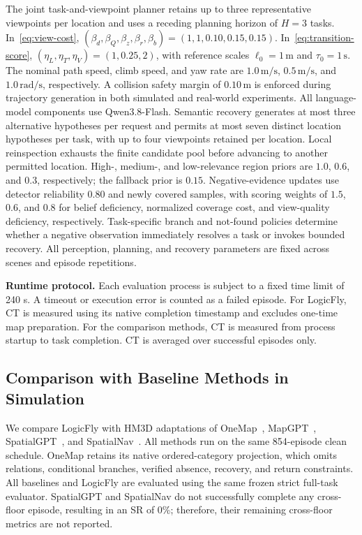 \documentclass[letterpaper,10pt,journal]{IEEEtran}
\begin{document}
The joint task-and-viewpoint planner retains up to three representative viewpoints per location and uses a receding planning horizon of $H=3$ tasks. In~\eqref{eq:view-cost}, $(\beta_d,\beta_Q,\beta_z,\beta_r,\beta_b)=(1,1,0.10,0.15,0.15)$. In~\eqref{eq:transition-score}, $(\eta_L,\eta_T,\eta_V)=(1,0.25,2)$, with reference scales $\ell_0=1\,\mathrm{m}$ and $\tau_0=1\,\mathrm{s}$. The nominal path speed, climb speed, and yaw rate are $1.0\,\mathrm{m/s}$, $0.5\,\mathrm{m/s}$, and $1.0\,\mathrm{rad/s}$, respectively. A collision safety margin of $0.10\,\mathrm{m}$ is enforced during trajectory generation in both simulated and real-world experiments. All language-model components use Qwen3.8-Flash. Semantic recovery generates at most three alternative hypotheses per request and permits at most seven distinct location hypotheses per task, with up to four viewpoints retained per location. Local reinspection exhausts the finite candidate pool before advancing to another permitted location. High-, medium-, and low-relevance region priors are $1.0$, $0.6$, and $0.3$, respectively; the fallback prior is $0.15$. Negative-evidence updates use detector reliability $0.80$ and newly covered samples, with scoring weights of $1.5$, $0.6$, and $0.8$ for belief deficiency, normalized coverage cost, and view-quality deficiency, respectively. Task-specific branch and not-found policies determine whether a negative observation immediately resolves a task or invokes bounded recovery. All perception, planning, and recovery parameters are fixed across scenes and episode repetitions.



\textbf{Runtime protocol.}
Each evaluation process is subject to a fixed time limit of 240 s. A timeout or execution error is counted as a failed episode. For LogicFly, CT is measured using its native completion timestamp and excludes one-time map preparation. For the comparison methods, CT is measured from process startup to task completion. CT is averaged over successful episodes only.





\subsection{Comparison with Baseline Methods in Simulation}
We compare LogicFly with HM3D adaptations of OneMap~\cite{busch2025onemap}, MapGPT~\cite{chen2024mapgpt}, SpatialGPT~\cite{jiang2025spatialgpt}, and SpatialNav~\cite{zhang2026spatialnav}. All methods run on the same 854-episode clean schedule. OneMap retains its native ordered-category projection, which omits relations, conditional branches, verified absence, recovery, and return constraints. All baselines and LogicFly are evaluated using the same frozen strict full-task evaluator. SpatialGPT and SpatialNav do not successfully complete any cross-floor episode, resulting in an SR of 0\%; therefore, their remaining cross-floor metrics are not reported.
\end{document}
